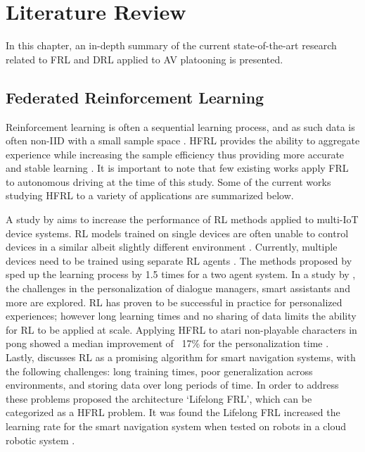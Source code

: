\chapter{Literature Review} \label{chap:litreview}
In this chapter, an in-depth summary of the current state-of-the-art research related to 
FRL and DRL applied to AV platooning is presented. 

\section{Federated Reinforcement Learning}

Reinforcement learning is often a sequential learning process, and as such data is often 
non-IID with a small sample space \cite{sutton2018reinforcement}.  HFRL provides the ability 
to aggregate experience while increasing the sample efficiency thus providing more accurate 
and stable learning  \cite{IntelAI19}. It is important to note that few existing works apply 
FRL to autonomous driving at the time of this study.  Some of the current works studying 
HFRL to a variety of applications are summarized below.

A study by \cite{Lim2020} aims to increase the performance of RL methods applied to 
multi-IoT device systems.  RL models trained on single devices are often unable to control 
devices in a similar albeit slightly different environment \cite{Lim2020}.  Currently, 
multiple devices need to be trained using separate RL agents \cite{Lim2020}. The methods 
proposed by \cite{Lim2020} sped up the learning process by 1.5 times for a two agent system. 
In a study by \cite{Nadiger2019}, the challenges in the personalization of dialogue 
managers, smart assistants and more are explored.  RL has proven to be successful in 
practice for personalized experiences; however long learning times and no sharing of data 
limits the ability for RL to be applied at scale.  Applying HFRL to atari non-playable 
characters in pong showed a median improvement of ~17\% for the personalization time 
\cite{Nadiger2019}. Lastly, \cite{Liu2019b} discusses RL as a promising algorithm for 
smart navigation systems, with the following challenges: long training times, poor 
generalization across environments, and storing data over long periods of time.  In order 
to address these problems \cite{Liu2019b} proposed the architecture `Lifelong FRL', 
which can be categorized as a HFRL problem.  It was found the Lifelong FRL increased 
the learning rate for the smart navigation system when tested on robots in a cloud 
robotic system \cite{Liu2019b}.  

